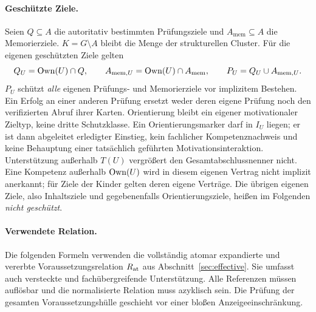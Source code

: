 \paragraph{Geschützte Ziele.}
Seien $Q\subseteq A$ die autoritativ bestimmten Prüfungsziele und
$A_{\mathrm{mem}}\subseteq A$ die Memorierziele. $K=G\setminus A$ bleibt
die Menge der strukturellen Cluster. Für die eigenen geschützten Ziele gelten
\[
 Q_U=\operatorname{Own}(U)\cap Q,\qquad
 A_{\mathrm{mem},U}=\operatorname{Own}(U)\cap A_{\mathrm{mem}},\qquad
 P_U=Q_U\cup A_{\mathrm{mem},U}.
\]
$P_U$ schützt \emph{alle} eigenen Prüfungs- und Memorierziele vor
implizitem Bestehen. Ein Erfolg an einer anderen Prüfung ersetzt weder
deren eigene Prüfung noch den verifizierten Abruf ihrer Karten.
Orientierung bleibt ein eigener motivationaler Zieltyp, keine dritte
Schutzklasse. Ein Orientierungsmarker darf in $I_U$ liegen; er ist dann
abgeleitet erledigter Einstieg, kein fachlicher Kompetenznachweis und
keine Behauptung einer tatsächlich geführten Motivationsinteraktion.
Unterstützung außerhalb $T(U)$ vergrößert den Gesamtabschlussnenner nicht.
Eine Kompetenz außerhalb $\operatorname{Own}(U)$ wird in diesem eigenen Vertrag nicht
implizit anerkannt; für Ziele der Kinder gelten deren eigene Verträge.
Die übrigen eigenen Ziele, also Inhaltsziele und gegebenenfalls
Orientierungsziele, heißen im Folgenden \emph{nicht geschützt}.

\paragraph{Verwendete Relation.}
Die folgenden Formeln verwenden die vollständig atomar expandierte und
vererbte Voraussetzungsrelation $R_{\mathrm{at}}$ aus
Abschnitt~\ref{sec:effective}.
Sie umfasst auch versteckte und
fachübergreifende Unterstützung. Alle Referenzen müssen auflösbar und die
normalisierte Relation muss azyklisch sein. Die Prüfung der gesamten
Voraussetzungshülle geschieht vor einer bloßen Anzeigeeinschränkung.

